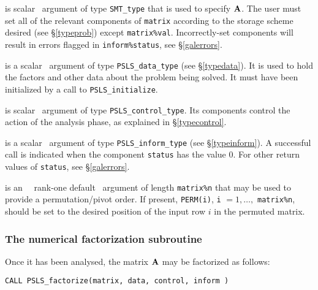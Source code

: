\documentclass{galahad}
\newcommand{\packagename}{PSLS}
\begin{document}
\begin{description}
 is scalar \intentin\ argument of type {\tt SMT\_type}
that is used to specify ${\mathbf{A}}$.
The user must set all of the relevant components of {\tt matrix} according
to the storage scheme desired (see \S\ref{typeprob}) except
{\tt matrix\%val}. Incorrectly-set components will result in errors
flagged in {\tt inform\%status}, see \S\ref{galerrors}.

 is a scalar \intentinout\ argument of type
{\tt \packagename\_data\_type}
(see \S\ref{typedata}). It is used to hold the factors and other
data about the problem being solved.
It must have been initialized by a call to
{\tt \packagename\_ini\-tialize}.

 is scalar \intentin\ argument of type
{\tt \packagename\_control\_type}. Its components control the action
of the analysis phase, as explained in
\S\ref{typecontrol}.

 is a scalar \intentinout\ argument of type
{\tt \packagename\_inform\_type}
(see \S\ref{typeinform}).
A successful call is indicated when the  component {\tt status} has the value 0.
For other return values of {\tt status}, see \S\ref{galerrors}.

 is an \optional\ \intentin\ rank-one default \integer\ argument of
length {\tt matrix\%n} that may be used to provide a permutation/pivot
order.
If present, {\tt PERM(i)}, {\tt i} $= 1, \ldots,$ {\tt matrix\%n}, should be set
to the desired position of the input row $i$ in the permuted matrix.

\end{description}


\subsubsection{The numerical factorization subroutine}
Once it has been analysed, the matrix ${\mathbf{A}}$ may be factorized as follows:

\hskip0.5in
{\tt CALL \packagename\_factorize(matrix, data, control, inform )}
\end{document}
